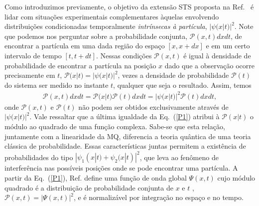 Como introduzimos previamente, o objetivo da extensão STS proposta na Ref.~\cite{Dias} é lidar com situações experimentais complementares àquelas envolvendo distribuições condicionadas temporalmente \textit {intrínsecas à partícula}, $|\psi(x|t)|^ 2 $. Note que podemos nos perguntar sobre a probabilidade conjunta, ${\mathcal P}(x,t)dxdt$, de encontrar a partícula em uma dada região do espaço $[x,x+dx]$ e em um certo intervalo de tempo $[t,t+dt]$. Nessas condições ${\mathcal P}(x,t)$ é igual à densidade de probabilidade de encontrar a partícula na posição $x$ dado que a observação ocorre precisamente em $t$, ${\mathcal P}(x|t )=|\psi(x|t)|^2$, vezes a densidade de probabilidade ${\mathcal P}(t)$ do sistema ser medido no instante $t$, qualquer que seja o resultado. Assim, temos
\begin{eqnarray}
\label{P1}
{\mathcal P}(x,t)dxdt={\mathcal P}(x|t){\mathcal P}(t)dxdt=|\psi(x|t)|^2{\mathcal P}(t)dxdt,
\end{eqnarray}
onde ${\mathcal P}(x,t)$ e ${\mathcal P}(t)$ não podem ser obtidos exclusivamente através de $|\psi(x|t)|^2$. Vale ressaltar que a última igualdade da Eq.~(\ref{P1}) atribui à ${\mathcal P}(x|t)$ o módulo ao quadrado de uma função complexa. Sabe-se que esta relação, juntamente com a linearidade da MQ, diferencia a teoria quântica de uma teoria clássica de probabilidade. Essas características juntas permitem a existência de probabilidades do tipo $|\psi_1(x|t)+\psi_2(x|t)|^2$, que leva ao fenômeno de interferência nas possíveis posições onde se pode encontrar uma partícula. A partir da Eq.~(\ref{P1}), Ref. \cite{Dias} define uma função de onda global $\Psi(x,t)$ cujo módulo quadrado é a distribuição de probabilidade conjunta de $x$ e $t$ , ${\mathcal P}(x,t)=|\Psi(x,t)|^2$, e é normalizável por integração no espaço e no tempo. 


